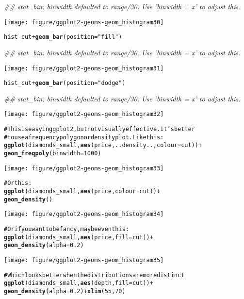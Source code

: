 \documentclass[a4paper,titlepage]{tufte-handout}\usepackage{graphicx, color}
\makeatletter
\def\maxwidth{ %
  \ifdim\Gin@nat@width>\linewidth
    \linewidth
  \else
    \Gin@nat@width
  \fi
}
\newcommand{\hlfunctioncall}[1]{\textcolor[rgb]{0.501960784313725,0,0.329411764705882}{\textbf{#1}}}%
\newcommand{\hlstring}[1]{\textcolor[rgb]{0.6,0.6,1}{#1}}%
\newcommand{\hlcomment}[1]{\textcolor[rgb]{0.180392156862745,0.6,0.341176470588235}{#1}}%
\newenvironment{kframe}{%
 \def\at@end@of@kframe{}%
 \ifinner\ifhmode%
  \def\at@end@of@kframe{\end{minipage}}%
  \begin{minipage}{\columnwidth}%
 \fi\fi%
 \def\FrameCommand##1{\hskip\@totalleftmargin \hskip-\fboxsep
 \colorbox{shadecolor}{##1}\hskip-\fboxsep
     \hskip-\linewidth \hskip-\@totalleftmargin \hskip\columnwidth}%
 \MakeFramed {\advance\hsize-\width
   \@totalleftmargin\z@ \linewidth\hsize
   \@setminipage}}%
 {\par\unskip\endMakeFramed%
 \at@end@of@kframe}
\newenvironment{knitrout}{}{} %
\makeatother
\begin{document}
\begin{knitrout}
\begin{kframe}
{\ttfamily\noindent\itshape\textcolor{messagecolor}{\#\# stat\_bin: binwidth defaulted to range/30. Use 'binwidth = x' to adjust this.}}\end{kframe}\texttt{[image: figure/ggplot2-geoms-geom\_histogram30]} \begin{kframe}\begin{alltt}
hist_cut + \hlfunctioncall{geom_bar}(position=\hlstring{"fill"})
\end{alltt}


{\ttfamily\noindent\itshape\textcolor{messagecolor}{\#\# stat\_bin: binwidth defaulted to range/30. Use 'binwidth = x' to adjust this.}}\end{kframe}\texttt{[image: figure/ggplot2-geoms-geom\_histogram31]} \begin{kframe}\begin{alltt}
hist_cut + \hlfunctioncall{geom_bar}(position=\hlstring{"dodge"})
\end{alltt}


{\ttfamily\noindent\itshape\textcolor{messagecolor}{\#\# stat\_bin: binwidth defaulted to range/30. Use 'binwidth = x' to adjust this.}}\end{kframe}\texttt{[image: figure/ggplot2-geoms-geom\_histogram32]} \begin{kframe}\begin{alltt}
\hlcomment{# This is easy in ggplot2, but not visually effective.  It's better}
\hlcomment{# to use a frequency polygon or density plot.  Like this:}
\hlfunctioncall{ggplot}(diamonds_small, \hlfunctioncall{aes}(price, ..density.., colour = cut)) +
  \hlfunctioncall{geom_freqpoly}(binwidth = 1000)
\end{alltt}
\end{kframe}\texttt{[image: figure/ggplot2-geoms-geom\_histogram33]} \begin{kframe}\begin{alltt}
\hlcomment{# Or this:}
\hlfunctioncall{ggplot}(diamonds_small, \hlfunctioncall{aes}(price, colour = cut)) +
  \hlfunctioncall{geom_density}()
\end{alltt}
\end{kframe}\texttt{[image: figure/ggplot2-geoms-geom\_histogram34]} \begin{kframe}\begin{alltt}
\hlcomment{# Or if you want to be fancy, maybe even this:}
\hlfunctioncall{ggplot}(diamonds_small, \hlfunctioncall{aes}(price, fill = cut)) +
  \hlfunctioncall{geom_density}(alpha = 0.2)
\end{alltt}
\end{kframe}\texttt{[image: figure/ggplot2-geoms-geom\_histogram35]} \begin{kframe}\begin{alltt}
\hlcomment{# Which looks better when the distributions are more distinct}
\hlfunctioncall{ggplot}(diamonds_small, \hlfunctioncall{aes}(depth, fill = cut)) +
  \hlfunctioncall{geom_density}(alpha = 0.2) + \hlfunctioncall{xlim}(55, 70)
\end{alltt}



\end{kframe}
\end{knitrout}
\end{document}
